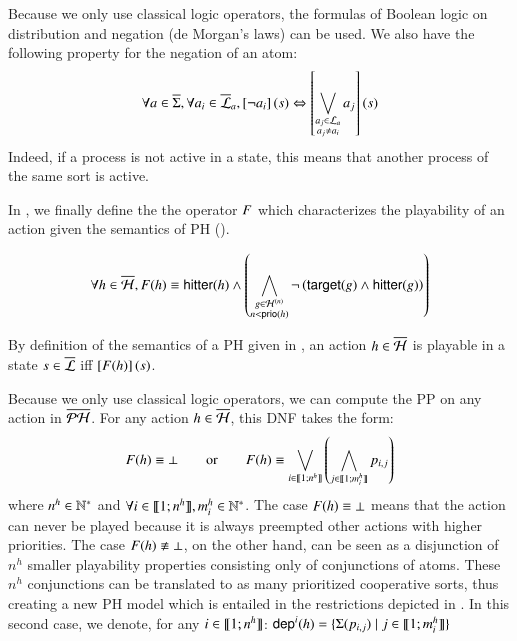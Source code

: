Because we only use classical logic operators, the formulas of Boolean logic on distribution and negation (de Morgan's laws) can be used.
We also have the following property for the negation of an atom:
\[\forall a \in \overline{\Sigma}, \forall a_i \in \overline{\mathcal{L}}_a, \left[\neg a_i\right](s)
  \Leftrightarrow \left[\bigvee_{\substack{a_j \in \mathcal{L}_a\\a_j \neq a_i}} a_j\right](s)\]
Indeed, if a process is not active in a state, this means that another process of the same sort is active.

In , we finally define the the operator $F$ which characterizes the playability of an action
given the semantics of PH ().
\begin{definition}\label{def:fop}
  $$\forall h \in \overline{\mathcal{H}}, F(h) \equiv \mathsf{hitter}(h) \wedge
    \left( \bigwedge_{\substack{g \in \mathcal{H}^{(n)}\\n < \mathsf{prio}(h)}}
    \neg \left( \mathsf{target}(g) \wedge \mathsf{hitter}(g)\right) \right)$$
\end{definition}

By definition of the semantics of a PH given in ,
an action $h \in \overline{\mathcal{H}}$ is playable in a state $s \in \overline{\mathcal{L}}$ iff $\left[F(h)\right](s)$.




\newcommand{\n}[1][h]{n^{#1}}
\newcommand{\m}[1][h]{m^{#1}}

Because we only use classical logic operators, we can compute the PP on any action in $\overline{\mathcal{PH}}$.
For any action $h \in \overline{\mathcal{H}}$, this DNF takes the form:
\[\Fop{h} \equiv \bot \qquad \text{or} \qquad
  \Fop{h} \equiv \bigvee_{i \in \segm{1}{\n}} \left( \bigwedge_{j \in \segm{1}{\m_i}} p_{i,j} \right)\]
where $\n \in \sN^*$ and $\forall i \in \segm{1}{\n}, \m_i \in \sN^*$.
The case $F(h) \equiv \bot$ means that the action can never be played
because it is always preempted other actions with higher priorities.
The case $F(h) \not\equiv \bot$, on the other hand,
can be seen as a disjunction of $\n$ smaller playability properties consisting only of conjunctions of atoms.
These $\n$ conjunctions can be translated to as many prioritized cooperative sorts,
thus creating a new PH model which is entailed in the restrictions depicted in .
In this second case, we denote, for any $i \in \segm{1}{\n}$:
$\PHdep{i}{h} = \{ \PHsort(p_{i,j}) \mid j \in \segm{1}{\m_i} \}$





